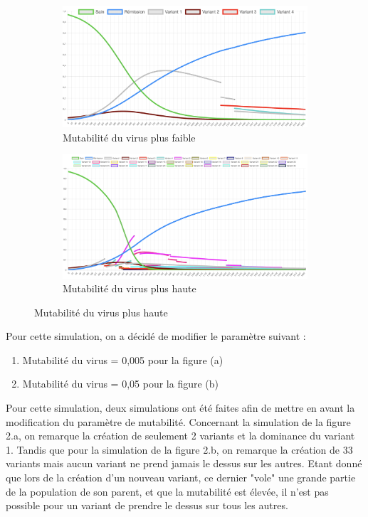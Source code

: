 \documentclass{article}
\begin{document}
\begin{figure}[h]
  \begin{subfigure}{.5\textwidth}
  \centering
  \includegraphics[width=1\linewidth]{images/Simulation2_1.png}
  \caption{Mutabilité du virus plus faible}
  \label{fig:sub1}
\end{subfigure}%
\begin{subfigure}{.5\textwidth}
  \centering
  \includegraphics[width=1\linewidth]{images/Simulation2_2.png}
  \caption{Mutabilité du virus plus haute}
  \label{fig:sub2}
\end{subfigure}
\end{figure}

Pour cette simulation, on a décidé de modifier le paramètre suivant :
\begin{enumerate}
    \item Mutabilité du virus = 0,005 pour la figure (a)
    \item Mutabilité du virus = 0,05 pour la figure (b) \\
\end{enumerate}

\noindent
Pour cette simulation, deux simulations ont été faites afin de mettre en avant la modification du paramètre de mutabilité. Concernant la simulation de la figure 2.a, on remarque la création de seulement 2 variants et la dominance du variant 1. Tandis que pour la simulation de la figure 2.b, on remarque la création de 33 variants mais aucun variant ne prend jamais le dessus sur les autres. Etant donné que lors de la création d'un nouveau variant, ce dernier "vole" une grande partie de la population de son parent, et que la mutabilité est élevée, il n'est pas possible pour un variant de prendre le dessus sur tous les autres.
\end{document}

